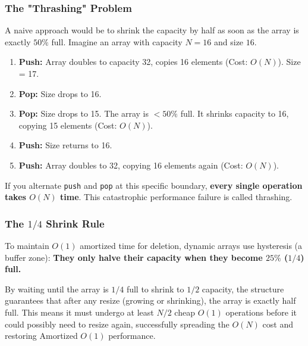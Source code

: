 \documentclass{article}
\begin{document}
\subsubsection{The "Thrashing" Problem}
A naive approach would be to shrink the capacity by half as soon as the array is exactly $50\%$ full. 
Imagine an array with capacity $N=16$ and size $16$.
\begin{enumerate}
    \item \textbf{Push:} Array doubles to capacity 32, copies 16 elements (Cost: $O(N)$). Size = 17.
    \item \textbf{Pop:} Size drops to 16.
    \item \textbf{Pop:} Size drops to 15. The array is $< 50\%$ full. It shrinks capacity to 16, copying 15 elements (Cost: $O(N)$). 
    \item \textbf{Push:} Size returns to 16.
    \item \textbf{Push:} Array doubles to 32, copying 16 elements again (Cost: $O(N)$).
\end{enumerate}

If you alternate \texttt{push} and \texttt{pop} at this specific boundary, \textbf{every single operation takes $O(N)$ time}. This catastrophic performance failure is called thrashing.

\subsubsection{The $1/4$ Shrink Rule}
To maintain $O(1)$ amortized time for deletion, dynamic arrays use hysteresis (a buffer zone): \textbf{They only halve their capacity when they become $25\%$ ($1/4$) full.}

By waiting until the array is $1/4$ full to shrink to $1/2$ capacity, the structure guarantees that after any resize (growing or shrinking), the array is exactly half full. This means it must undergo at least $N/2$ cheap $O(1)$ operations before it could possibly need to resize again, successfully spreading the $O(N)$ cost and restoring Amortized $O(1)$ performance.
\end{document}
